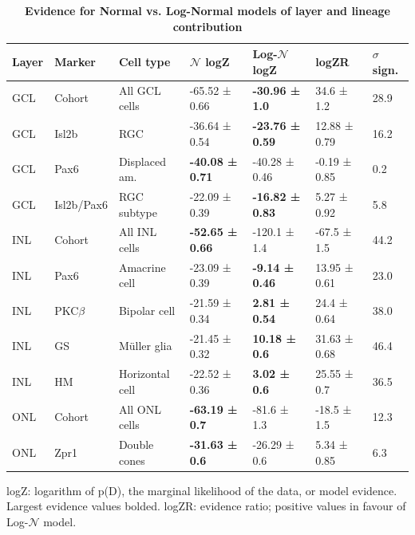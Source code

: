 \documentclass{ut-thesis}
\begin{document}
\begin{NoHyper}
\begin{table}[!ht]
    \caption{{\bf Evidence for Normal vs. Log-Normal models of layer and lineage contribution}}
    \begin{tabular}{|l|l|l|l|l|l|l|} 
        \hline
        {\bf Layer} & {\bf Marker} & {\bf Cell type} & {\bf $\mathcal{N}$ logZ} & {\bf Log-$\mathcal{N}$ logZ} & {\bf logZR} & {\bf $\sigma$ sign.}\\ \hline \hline
        GCL & Cohort & All GCL cells &  -65.52 ± 0.66 & {\bf -30.96 ± 1.0} & 34.6 ± 1.2 & 28.9\\ \hline
        GCL & Isl2b & RGC & -36.64 ± 0.54 & {\bf -23.76 ± 0.59} & 12.88 ± 0.79 & 16.2\\ \hline
        GCL & Pax6 & Displaced am. & {\bf -40.08 ± 0.71} & -40.28 ± 0.46 & -0.19 ± 0.85 & 0.2\\ \hline
        GCL & Isl2b/Pax6 & RGC subtype & -22.09 ± 0.39 & {\bf -16.82 ± 0.83} & 5.27 ± 0.92 & 5.8\\ \hline \hline
        INL & Cohort & All INL cells & {\bf -52.65 ± 0.66} & -120.1 ± 1.4 & -67.5 ± 1.5 & 44.2\\ \hline
        INL & Pax6 & Amacrine cell & -23.09 ± 0.39 & {\bf -9.14 ± 0.46} & 13.95 ± 0.61 & 23.0\\ \hline
        INL & PKC$\beta$ & Bipolar cell & -21.59 ± 0.34 & {\bf 2.81 ± 0.54} & 24.4 ± 0.64 & 38.0\\ \hline
        INL & GS & M\"{u}ller glia & -21.45 ± 0.32 & {\bf 10.18 ± 0.6} & 31.63 ± 0.68 & 46.4\\ \hline
        INL & HM & Horizontal cell & -22.52 ± 0.36 & {\bf 3.02 ± 0.6} & 25.55 ± 0.7 & 36.5\\ \hline \hline
        ONL & Cohort & All ONL cells &{\bf -63.19 ± 0.7} & -81.6 ± 1.3 & -18.5 ± 1.5 & 12.3\\ \hline
        ONL & Zpr1 & Double cones &  {\bf -31.63 ± 0.6} & -26.29 ± 0.6 & 5.34 ± 0.85 & 6.3\\ \hline
    \end{tabular}
    \begin{flushleft}logZ: logarithm of p(D), the marginal likelihood of the data, or model evidence.  Largest evidence values bolded. logZR: evidence ratio; positive values in favour of Log-$\mathcal{N}$ model.
    \end{flushleft}
    \label{lineage_nlnev}
\end{table}


\end{NoHyper}
\end{document}
